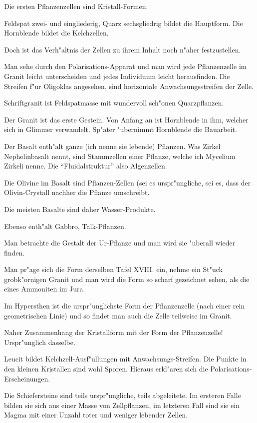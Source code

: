 \documentclass[a4paper, 11pt, oneside, german]{article}
\begin{document}
Die ersten Pflanzenzellen sind Kristall-Formen.

Feldspat zwei- und eingliederig, Quarz sechsgliedrig bildet die Hauptform. Die Hornblende bildet die Kelchzellen.

Doch ist das Verh"altnis der Zellen zu ihrem Inhalt noch n"aher festzustellen.

Man sehe durch den Polarisations-Apparat und man wird jede Pflanzenzelle im Granit leicht unterscheiden und jedes Individuum leicht herausfinden. Die Streifen f"ur Oligoklas angesehen, sind horizontale Anwachsungsstreifen der Zelle.

Schriftgranit ist Feldspatmasse mit wundervoll sch"onen Quarzpflanzen.

Der Granit ist das erste Gestein. Von Anfang an ist Hornblende in ihm, welcher sich in Glimmer verwandelt. Sp"ater "ubernimmt Hornblende die Bauarbeit.

Der Basalt enth"alt ganze (ich nenne sie lebende) Pflanzen. Was Zirkel Nephelinbasalt nennt, sind Stammzellen einer Pflanze, welche ich Mycelium Zirkeli nenne. Die "`Fluidalstruktur"' also Algenzellen.

Die Olivine im Basalt sind Pflanzen-Zellen (sei es urspr"ungliche, sei es, dass der Olivin-Crystall nachher die Pflanze umschreibt.

Die meisten Basalte sind daher Wasser-Produkte.

Ebenso enth"alt Gabbro, Talk-Pflanzen.

Man betrachte die Gestalt der Ur-Pflanze und man wird sie "uberall wieder finden.

Man pr"age sich die Form derselben Tafel XVIII. ein, nehme ein St"uck grobk"ornigen Granit und man wird die Form so scharf gezeichnet sehen, als die eines Ammoniten im Jura.

Im Hypersthen ist die urspr"unglichste Form der Pflanzenzelle (nach einer rein geometrischen Linie) und so findet man auch die Zelle teilweise im Granit.

Naher Zusammenhang der Kristallform mit der Form der Pflanzenzelle! Urspr"unglich dasselbe.

Leucit bildet Kelchzell-Ausf"ullungen mit Anwachsungs-Streifen. Die Punkte in den kleinen Kristallen sind wohl Sporen. Hieraus erkl"aren sich die Polarisations-Erscheinungen.

Die Schiefersteine sind teils urspr"ungliche, teils abgeleitete. Im ersteren Falle bilden sie sich aus einer Masse von Zellpflanzen, im letzteren Fall sind sie ein Magma mit einer Unzahl toter und weniger lebender Zellen.
\end{document}
